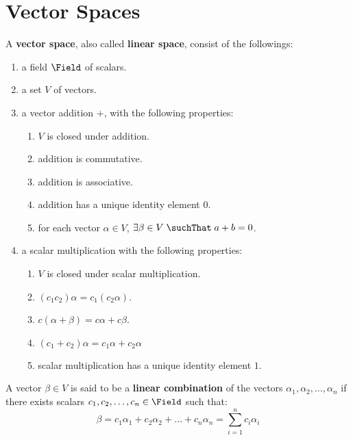 \chapter{Vector Spaces}
\thispagestyle{headings}

A \textbf{vector space}, also called \textbf{linear space}, consist of the followings:
\begin{enumerate}
    \item a field \(\Field\) of scalars.
    \item a set \(V\) of vectors.
    \item a vector addition \(+\), with the following properties:
          \begin{enumerate}
              \item \(V\) is closed under addition.
              \item addition is commutative.
              \item addition is associative.
              \item addition has a unique identity element \(0\).
              \item for each vector \(\alpha \in V\), \(\exists \beta \in V \; \suchThat \; a +b = 0\).
          \end{enumerate}
    \item a scalar multiplication with the following properties:
          \begin{enumerate}
              \item \(V\) is closed under scalar multiplication.
              \item \((c_1c_2)\alpha = c_1(c_2 \alpha)\).
              \item \(c(\alpha + \beta) = c \alpha + c \beta\).
              \item \((c_1 + c_2) \alpha = c_1 \alpha + c_2 \alpha\)
              \item scalar multiplication has a unique identity element \(1\).
          \end{enumerate}
\end{enumerate}

\begin{definition}
    A vector \(\beta \in V\) is said to be a \textbf{linear combination} of the vectors \(\alpha_1, \alpha_2, \dots, \alpha_n\) if there exists scalars \(c_1, c_2, \dots, c_n \in \Field\) such that:
    \begin{equation*}
        \beta = c_1 \alpha_1 + c_2 \alpha_2 + \dots + c_n \alpha_n = \sum_{i = 1}^{n} c_i \alpha_i
    \end{equation*}
\end{definition}

